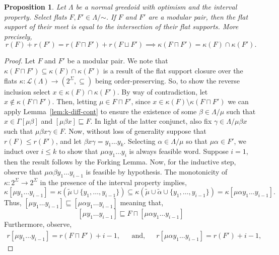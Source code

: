 \documentclass[11pt]{article}
\newtheorem{proposition}[theorem]{Proposition}
\newcommand{\univ}{\Sigma}
\newcommand{\glang}{\Lambda}
\providecommand{\L}{}
\renewcommand{\L}{\mathscr{L}}
\begin{document}
\begin{proposition}\label{prop:mod-k-closed}
    Let $\glang$ be a normal greedoid with optimism and the interval property.
    Select flats $F, F'\in\glang/\mathord{\sim}$.
    If $F$ and $F'$ are a modular pair, then the flat support of their meet is equal to the intersection of their flat supports.
    More precisely,
    \[
        r(F)+r(F') = r(F\sqcap F') + r(F\sqcup F') \implies \kappa(F\sqcap F') = \kappa(F) \cap \kappa(F').
    \]
\end{proposition}
\begin{proof}
    Let $F$ and $F'$ be a modular pair.
    We note that $\kappa(F\sqcap F') \subseteq \kappa(F) \cap \kappa(F')$ is a result of the flat support closure over the flats $\kappa:\L(\glang)\to\left(2^\univ,\subseteq\right)$ being order-preserving.
    So, to show the reverse inclusion select $x \in \kappa(F) \cap \kappa(F')$.
    By way of contradiction, let $x \notin \kappa(F\sqcap F')$.
    Then, letting $\mu \in F\sqcap F'$, since $x \in \kappa(F) \setminus \kappa(F\sqcap F')$ we can apply Lemma~\ref{lem:k-diff-cont} to ensure the existence of some $\beta \in \glang/\mu$ such that $x \in \Gamma[\mu \beta]$ and $[\mu\beta x]\sqsubseteq F$.
    In light of the latter conjunct, also fix $\gamma \in \glang/\mu\beta x$ such that $\mu\beta x \gamma \in F$.
    Now, without loss of generality suppose that $r(F) \leq r(F')$, and let $\beta x \gamma = y_1\ldots y_k$.
    Selecting $\alpha \in \glang/\mu$ so that $\mu \alpha \in F'$, we induct over $i \leq k$ to show that $\mu\alpha y_1\ldots y_i$ is always feasible word.
    Suppose $i = 1$, then the result follows by the Forking Lemma.
    Now, for the inductive step, observe that $\mu\alpha\beta y_1\ldots y_{i-1}$ is feasible by hypothesis.
    The monotonicity of $\kappa:2^\univ\to 2^\univ$ in the presence of the interval property implies,
    \[
        \kappa[\mu y_1 \ldots y_{i-1}] = \kappa(\widetilde{\mu} \cup \{y_1,\ldots, y_{i-1}\}) \subseteq \kappa(\widetilde{\mu} \cup \widetilde{\alpha} \cup \{y_1,\ldots, y_{i-1}\}) = \kappa[\mu \alpha y_1\ldots y_{i-1}].
    \]
    Thus, $[\mu y_1\ldots y_{i-1}] \sqsubseteq [\mu \alpha y_1\ldots y_{i-1}]$ meaning that,
    \begin{equation}\label{eq:3333}
        [\mu y_1\ldots y_{i-1}] \sqsubseteq F\sqcap [\mu \alpha y_1\ldots y_{i-1}] 
    \end{equation}
    Furthermore, observe,
    \begin{align*}
        r[\mu y_1\ldots y_{i- 1}] = r(F\sqcap F') + i - 1,&&\text{and},&& r[\mu\alpha y_1\ldots y_{i-1}] = r(F') + i - 1,

\end{align*}
\end{proof}
\end{document}
